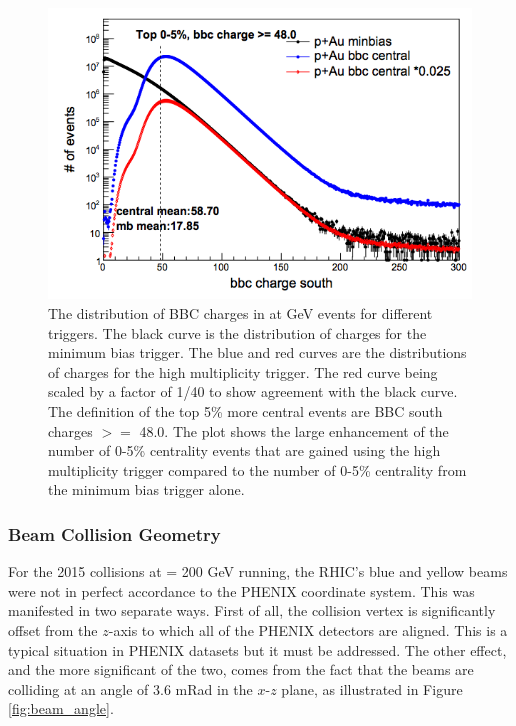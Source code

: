\begin{figure}[!ht]
\centering
\includegraphics[scale=0.55]{figs/pAu_centrality_trigger.png}
\caption{The distribution of BBC charges in \pau at  GeV events for different triggers. The black curve is the distribution of charges for the minimum bias trigger. The blue and red curves are the distributions of charges for the high multiplicity trigger. The red curve being scaled by a factor of 1/40 to show agreement with the black curve. The definition of the top 5\% more central events are BBC south charges $>=$ 48.0. The plot shows the large enhancement of the number of 0-5\% centrality events that are gained using the high multiplicity trigger compared to the number of 0-5\% centrality from the minimum bias trigger alone.}
\label{fig:pau_centrality_trig}
\end{figure}

\subsubsection{Beam Collision Geometry}
\label{sec:ch2_beam_col_geo}
For the 2015 \pau collisions at \sqsn = 200 GeV running, the RHIC's blue and yellow beams were not in perfect accordance to the PHENIX coordinate system. This was manifested in two separate ways. First of all, the collision vertex is significantly offset from the $z$-axis to which all of the PHENIX detectors are aligned. This is a typical situation in PHENIX datasets but it must be addressed. The other effect, and the more significant of the two, comes from the fact that the beams are colliding at an angle of 3.6 mRad in the $x$-$z$ plane, as illustrated in Figure \ref{fig:beam_angle}. 

